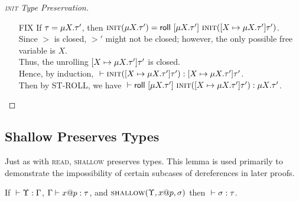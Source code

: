 \begin{proof}[\textsc{init} Type Preservation]
\begin{itemize}
    \item[FIX]
      If $\tau = \mu {X}.{\tau'}$,
      then $\textsc{init}({\mu {X}.{\tau'}}) 
         = \mathsf{roll}~[{\mu {X}.{\tau'}}]~{\textsc{init}({[{X} \mapsto {\mu {X}.{\tau'}}] {\tau'}})}$. \\
      Since $\gt$ is closed, $\gt'$ might not be closed;
      however, the only possible free variable is $X$. \\
      Thus, the unrolling $[{X} \mapsto {\mu {X}.{\tau'}}] {\tau'}$ is closed. \\
      Hence, by induction, 
      ${} \vdash {\textsc{init}({[{X} \mapsto {\mu {X}.{\tau'}}] {\tau'}})} : {[{X} \mapsto {\mu {X}.{\tau'}}] {\tau'}}$. \\
      Then by \textsc{ST-ROLL}, we have
      ${} \vdash {\mathsf{roll}~[{\mu {X}.{\tau'}}]~{\textsc{init}({[{X} \mapsto {\mu {X}.{\tau'}}] {\tau'}})}} : {\mu {X}.{\tau'}}$.
  \end{itemize}
\end{proof}

\subsection*{Shallow Preserves Types}
Just as with \textsc{read}, \textsc{shallow} preserves types.
This lemma is used primarily to demonstrate the impossibility 
of certain subcases of dereferences in later proofs.

\begin{lem}
  If ${} \vdash {\Upsilon} : {\Gamma}$, ${\Gamma} \vdash {{x}@{p}} : {\tau}$, and $\textsc{shallow}({\Upsilon},{{x}@{p}},{\sigma})$
  then ${} \vdash {\sigma} : {\tau}$.
\end{lem}


